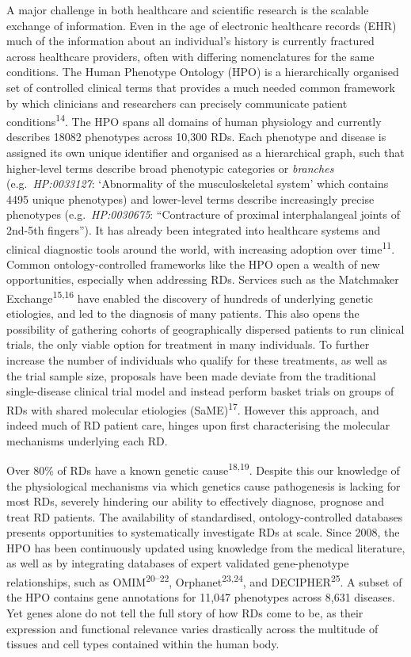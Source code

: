 \documentclass[
sn-nature
]{sn-jnl}
\begin{document}
A major challenge in both healthcare and scientific research is the
scalable exchange of information. Even in the age of electronic
healthcare records (EHR) much of the information about an individual's
history is currently fractured across healthcare providers, often with
differing nomenclatures for the same conditions. The Human Phenotype
Ontology (HPO) is a hierarchically organised set of controlled clinical
terms that provides a much needed common framework by which clinicians
and researchers can precisely communicate patient
conditions\textsuperscript{14}. The HPO spans all domains of human
physiology and currently describes 18082 phenotypes across 10,300 RDs.
Each phenotype and disease is assigned its own unique identifier and
organised as a hierarchical graph, such that higher-level terms describe
broad phenotypic categories or \emph{branches} (e.g.~\emph{HP:0033127}:
`Abnormality of the musculoskeletal system' which contains 4495 unique
phenotypes) and lower-level terms describe increasingly precise
phenotypes (e.g.~\emph{HP:0030675}: ``Contracture of proximal
interphalangeal joints of 2nd-5th fingers''). It has already been
integrated into healthcare systems and clinical diagnostic tools around
the world, with increasing adoption over time\textsuperscript{11}.
Common ontology-controlled frameworks like the HPO open a wealth of new
opportunities, especially when addressing RDs. Services such as the
Matchmaker Exchange\textsuperscript{15,16} have enabled the discovery of
hundreds of underlying genetic etiologies, and led to the diagnosis of
many patients. This also opens the possibility of gathering cohorts of
geographically dispersed patients to run clinical trials, the only
viable option for treatment in many individuals. To further increase the
number of individuals who qualify for these treatments, as well as the
trial sample size, proposals have been made deviate from the traditional
single-disease clinical trial model and instead perform basket trials on
groups of RDs with shared molecular etiologies
(SaME)\textsuperscript{17}. However this approach, and indeed much of RD
patient care, hinges upon first characterising the molecular mechanisms
underlying each RD.

Over 80\% of RDs have a known genetic cause\textsuperscript{18,19}.
Despite this our knowledge of the physiological mechanisms via which
genetics cause pathogenesis is lacking for most RDs, severely hindering
our ability to effectively diagnose, prognose and treat RD patients. The
availability of standardised, ontology-controlled databases presents
opportunities to systematically investigate RDs at scale. Since 2008,
the HPO has been continuously updated using knowledge from the medical
literature, as well as by integrating databases of expert validated
gene-phenotype relationships, such as OMIM\textsuperscript{20--22},
Orphanet\textsuperscript{23,24}, and DECIPHER\textsuperscript{25}. A
subset of the HPO contains gene annotations for 11,047 phenotypes across
8,631 diseases. Yet genes alone do not tell the full story of how RDs
come to be, as their expression and functional relevance varies
drastically across the multitude of tissues and cell types contained
within the human body.
\end{document}
